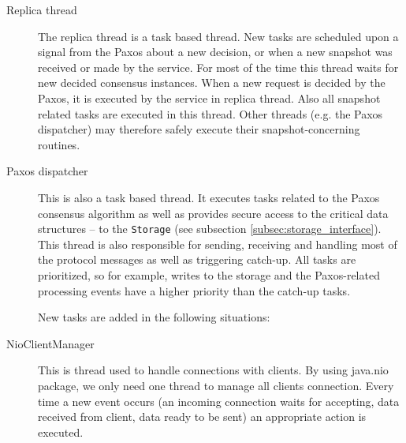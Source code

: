 \begin{description}
  \item[Replica thread] \hfill

    The replica thread is a task based thread. New tasks are scheduled upon a signal from the Paxos about a new decision, or when a new snapshot was received or made by the service. For most of the time this thread waits for new decided consensus instances. When a new request is decided by the Paxos, it is executed by the service in replica thread. Also all snapshot related tasks are executed in this thread. Other threads (e.g. the Paxos dispatcher) may therefore safely execute their snapshot-concerning routines.
    
  \item[Paxos dispatcher] \hfill \nopagebreak
    
    This is also a task based thread. It executes tasks related to the Paxos consensus algorithm as well as provides secure access to the critical data structures -- to the \texttt{Storage} (see subsection \ref{subsec:storage_interface}). This thread is also responsible for sending, receiving and handling most of the protocol messages as well as triggering catch-up. All tasks are prioritized, so for example, writes to the storage and the Paxos-related processing events have a higher priority than the catch-up tasks.
    
    New tasks are added in the following situations:
    
  \item[NioClientManager] \hfill

    This is thread used to handle connections with clients. By using java.nio package, we only need one thread to manage all clients connection. Every time a new event occurs (an incoming connection waits for accepting, data received from client, data ready to be sent) an appropriate action is executed. 


\end{description}
